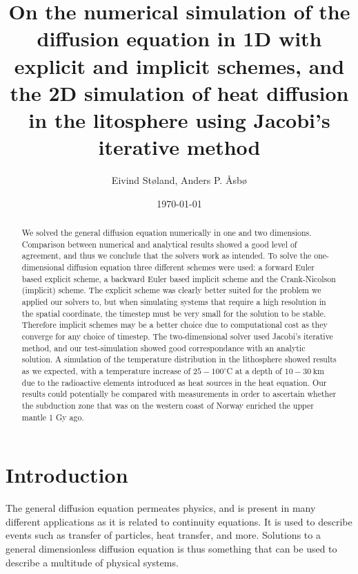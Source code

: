 \documentclass[reprint,english,notitlepage]{revtex4-1}  %
\begin{document}
\title{On the numerical simulation of the diffusion equation in 1D with explicit and implicit schemes, and the 2D simulation of heat diffusion in the litosphere using Jacobi's iterative method}   %
\author{Eivind Støland, Anders P. Åsbø}               %
\date{\today}                             %
\noaffiliation                            %

\begin{abstract}
We solved the general diffusion equation numerically in one and two dimensions. Comparison between numerical and analytical results showed a good level of agreement, and thus we conclude that the solvers work as intended. To solve the one-dimensional diffusion equation three different schemes were used: a forward Euler based explicit scheme, a backward Euler based implicit scheme and the Crank-Nicolson (implicit) scheme. The explicit scheme was clearly better suited for the problem we applied our solvers to, but when simulating systems that require a high resolution in the spatial coordinate, the timestep must be very small for the solution to be stable. Therefore implicit schemes may be a better choice due to computational cost as they converge for any choice of timestep. The two-dimensional solver used Jacobi's iterative method, and our test-simulation showed good correspondance with an analytic solution. A simulation of the temperature distribution in the lithosphere showed results as we expected, with a temperature increase of \(25-100^{\circ}\)C at a depth of \(10-\SI{30}{\kilo\metre}\) due to the radioactive elements introduced as heat sources in the heat equation. Our results could potentially be compared with measurements in order to ascertain whether the subduction zone that was on the western coast of Norway enriched the upper mantle 1 Gy ago.
\end{abstract}

\maketitle                                %


\tableofcontents
\newpage

\section{Introduction} \label{sec:introduction}

The general diffusion equation permeates physics, and is present in many different applications as it is related to continuity equations. It is used to describe events such as transfer of particles, heat transfer, and more. Solutions to a general dimensionless diffusion equation is thus something that can be used to describe a multitude of physical systems. 
\end{document}

